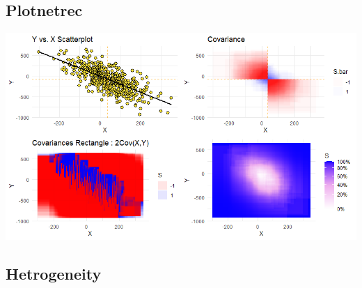 \documentclass[
]{report}
\begin{document}
\hypertarget{plotnetrec}{%
\subsection{Plotnetrec}\label{plotnetrec}}

\includegraphics{All.PNG}

\hypertarget{hetrogeneity}{%
\subsection{Hetrogeneity}\label{hetrogeneity}}
\end{document}
